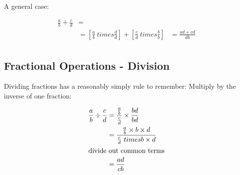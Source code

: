 A general case:

\begin{align}
  \frac{a}{b} + \frac{c}{d} & = \\
    & = [\frac{a}{b} \ times \frac{d}{d}] + [\frac{c}{d} \ times \frac{b}{b} ]
    & = \frac{ad + cd}{db} \\
\end{align}

\subsection{Fractional Operations - Division}
\label{sec:FractionalOperationsDivision}
Dividing fractions has a reasonably simply rule to remember: Multiply by the
inverse of one fraction:

\begin{align}
  \frac{a}{b} \div \frac{c}{d} & = \frac{ \frac{a}{b} }{ \frac{c}{d}} \times
  \frac{bd}{bd} \\
   & = \frac{\frac{a}{b}\times b \times d}{\frac{c}{d} \ times b \times d} \\
  \intertext{divide out common terms}
   & = \frac{ad}{cb}
\end{align}

